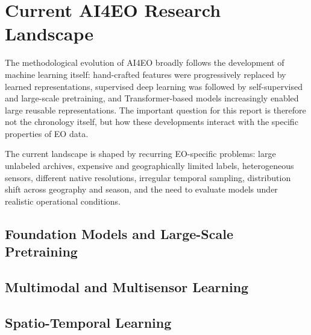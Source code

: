 \documentclass[
    11pt,
    a4paper,
    parskip=half,
    bibliography=totoc,
    numbers=noenddot
]{scrartcl}
\begin{document}
\section{Current AI4EO Research Landscape}

The methodological evolution of AI4EO broadly follows the development of
machine learning itself: hand-crafted features were progressively
replaced by learned representations, supervised deep learning was
followed by self-supervised and large-scale pretraining, and
Transformer-based models increasingly enabled large reusable
representations. The important question for this report is therefore not
the chronology itself, but how these developments interact with the
specific properties of EO data.

The current landscape is shaped by recurring EO-specific problems:
large unlabeled archives, expensive and geographically limited labels,
heterogeneous sensors, different native resolutions, irregular temporal
sampling, distribution shift across geography and season, and the need
to evaluate models under realistic operational conditions.

\subsection{Foundation Models and Large-Scale Pretraining}


\subsection{Multimodal and Multisensor Learning}


\subsection{Spatio-Temporal Learning}
\end{document}
